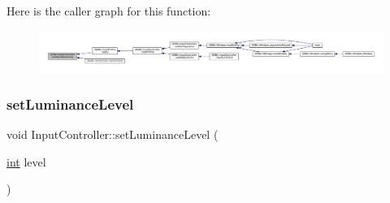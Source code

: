 Here is the caller graph for this function\+:
\nopagebreak
\begin{figure}[H]
\begin{center}
\leavevmode
\includegraphics[width=350pt]{class_q_g_b_a_1_1_input_controller_a41ba2b4efa8962b2b38d1d2fde889033_icgraph}
\end{center}
\end{figure}
\mbox{\label{class_q_g_b_a_1_1_input_controller_a2fc1c459b9c0d22e2222e766be1ec65f}} 
\subsubsection{\texorpdfstring{set\+Luminance\+Level}{setLuminanceLevel}}
{\footnotesize\ttfamily void Input\+Controller\+::set\+Luminance\+Level (\begin{DoxyParamCaption}\item[{\mbox{\hyperlink{ioapi_8h_a787fa3cf048117ba7123753c1e74fcd6}{int}}}]{level }\end{DoxyParamCaption})\hspace{0.3cm}{\ttfamily [slot]}}

